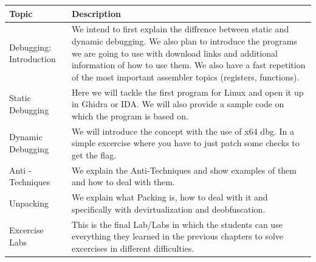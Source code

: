\begin{center}
    \begin{tabular}{ |p{3cm}|p{12cm}| } 
        \hline
            Topic & 
            Description \\ [0.5ex] 
        \hline
        \hline
            Debugging: Introduction & 
            We intend to first explain the diffrence between static and dynamic debugging. We also plan to introduce the programs we are going to use with download links and additional information of how to use them. We also have a fast repetition of the most important assembler topics (registers, functions).  \\ 
        \hline
            Static Debugging & 
            Here we will tackle the first program for Linux and open it up in Ghidra or IDA. We will also provide a sample code on which the program is based on. \\ 
        \hline
            Dynamic Debugging & 
            We will introduce the concept with the use of x64 dbg. In a simple excercise where you have to just patch some checks to get the flag. \\ 
        \hline
            Anti - Techniques & 
            We explain the Anti-Techniques and show examples of them and how to deal with them. \\ 
        \hline
            Unpacking & 
            We explain what Packing is, how to deal with it and specifically with devirtualization and deobfuscation. \\ 
        \hline
            Excercise Labs & 
            This is the final Lab/Labs in which the students can use everything they learned in the previous chapters to solve excercises in different difficulties. \\ 
        \hline
    \end{tabular}
\end{center}